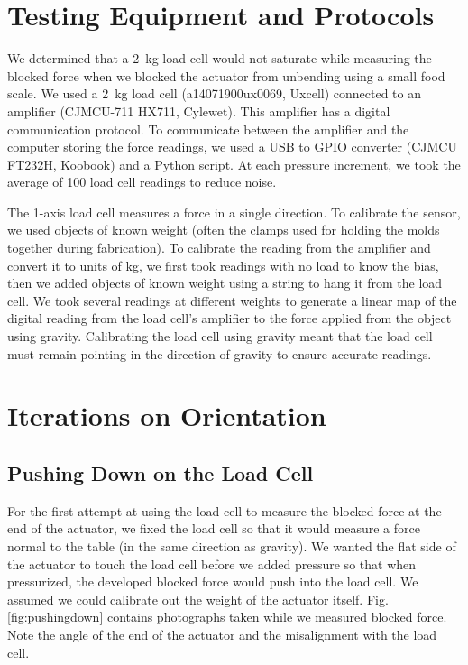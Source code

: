 \clearpage
\section{Testing Equipment and Protocols}

We determined that a 2~kg load cell would not saturate while measuring the blocked force when we blocked the actuator from unbending using a small food scale. We used a 2~kg load cell (a14071900ux0069, Uxcell) connected to an amplifier (CJMCU-711 HX711, Cylewet). This amplifier has a digital communication protocol. To communicate between the amplifier and the computer storing the force readings, we used a USB to GPIO converter (CJMCU FT232H, Koobook) and a Python script. At each pressure increment, we took the average of 100 load cell readings to reduce noise. 

The 1-axis load cell measures a force in a single direction. To calibrate the sensor, we used objects of known weight (often the clamps used for holding the molds together during fabrication). To calibrate the reading from the amplifier and convert it to units of kg, we first took readings with no load to know the bias, then we added objects of known weight using a string to hang it from the load cell. We took several readings at different weights to generate a linear map of the digital reading from the load cell's amplifier to the force applied from the object using gravity. Calibrating the load cell using gravity meant that the load cell must remain pointing in the direction of gravity to ensure accurate readings. 

\section{Iterations on Orientation}

\subsection{Pushing Down on the Load Cell}

For the first attempt at using the load cell to measure the blocked force at the end of the actuator, we fixed the load cell so that it would measure a force normal to the table (in the same direction as gravity). We wanted the flat side of the actuator to touch the load cell before we added pressure so that when pressurized, the developed blocked force would push into the load cell. We assumed we could calibrate out the weight of the actuator itself. Fig. \ref{fig:pushingdown} contains photographs taken while we measured blocked force. Note the angle of the end of the actuator and the misalignment with the load cell. \\

